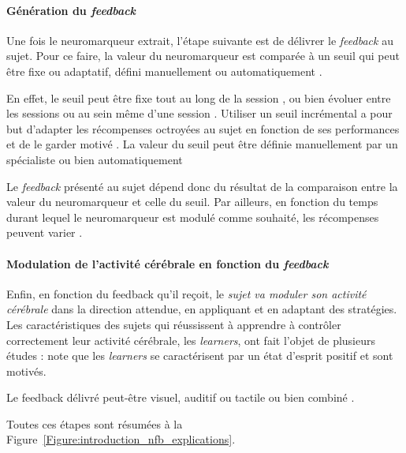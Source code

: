 \paragraph{Génération du \textit{feedback}}
Une fois le neuromarqueur extrait, l'étape suivante est de délivrer le \textit{feedback} au sujet. Pour ce faire, la valeur du neuromarqueur est comparée à un seuil
qui peut être fixe ou adaptatif, défini manuellement ou automatiquement \citep{Arns2014}.

En effet, le seuil peut être fixe tout au long de la session \citep{Kropotov2005, Monastra2002}, ou bien évoluer entre les sessions ou au sein même d'une session \citep{ 
Christiansen2014}. Utiliser un seuil incrémental a pour but d'adapter les récompenses octroyées au sujet en fonction de ses performances et 
de le garder motivé \citep{Bauer2016, Lansbergen2011}. La valeur du seuil peut être définie manuellement par un spécialiste ou bien automatiquement \citep{Arns2014}

Le \textit{feedback} présenté au sujet dépend donc du résultat de la comparaison entre la valeur du neuromarqueur et celle du seuil. Par ailleurs, en fonction du temps durant lequel
le neuromarqueur est modulé comme souhaité, les récompenses peuvent varier \citep{Bioulac2019}. 

\paragraph{Modulation de l'activité cérébrale en fonction du \textit{feedback}}
Enfin, en fonction du feedback qu'il reçoit, le \textit{sujet va moduler son activité cérébrale} dans la direction attendue, en appliquant et en adaptant des stratégies. 
Les caractéristiques des sujets qui réussissent à apprendre à contrôler correctement leur activité cérébrale, les \textit{learners}, ont fait l'objet de plusieurs études : 
\citet{Friedrich2014} note que les \textit{learners} se caractérisent par un état d'esprit positif et sont motivés. 

Le feedback délivré peut-être visuel, auditif ou tactile ou bien combiné \citep{Vernon2004}.

Toutes ces étapes sont résumées à la Figure~\ref{Figure:introduction_nfb_explications}.

